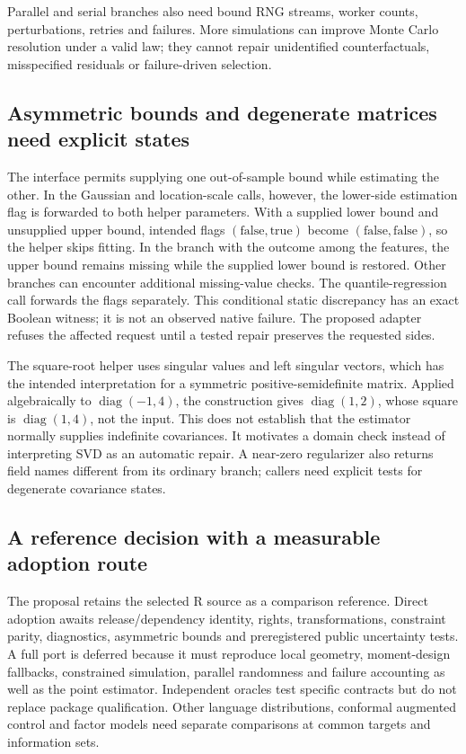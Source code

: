 Parallel and serial branches also need bound RNG streams, worker counts,
perturbations, retries and failures. More simulations can improve Monte
Carlo resolution under a valid law; they cannot repair unidentified
counterfactuals, misspecified residuals or failure-driven selection.
\citep{exec24_scpi_source,exec24_scpi_choice}

\subsection{Asymmetric bounds and degenerate matrices need explicit states}
The interface permits supplying one out-of-sample bound while estimating
the other. In the Gaussian and location-scale calls, however, the
lower-side estimation flag is forwarded to both helper parameters.
With a supplied lower bound and unsupplied upper bound, intended flags
$(\mathrm{false},\mathrm{true})$ become
$(\mathrm{false},\mathrm{false})$, so the helper skips fitting. In the
branch with the outcome among the features, the upper bound remains
missing while the supplied lower bound is restored. Other branches can
encounter additional missing-value checks. The quantile-regression call
forwards the flags separately. This conditional static discrepancy has
an exact Boolean witness; it is not an observed native failure. The
proposed adapter refuses the affected request until a tested repair
preserves the requested sides.~\citep{exec24_scpi_source,exec24_scpi_choice}

The square-root helper uses singular values and left singular vectors,
which has the intended interpretation for a symmetric positive-semidefinite
matrix. Applied algebraically to $\operatorname{diag}(-1,4)$, the
construction gives $\operatorname{diag}(1,2)$, whose square is
$\operatorname{diag}(1,4)$, not the input. This does not establish that the
estimator normally supplies indefinite covariances. It motivates a domain
check instead of interpreting SVD as an automatic repair. A near-zero
regularizer also returns field names different from its ordinary branch;
callers need explicit tests for degenerate covariance states.
\citep{exec24_scpi_source,exec24_scpi_choice}

\subsection{A reference decision with a measurable adoption route}
The proposal retains the selected R source as a comparison reference.
Direct adoption awaits release/dependency identity, rights, transformations,
constraint parity, diagnostics, asymmetric bounds and preregistered public
uncertainty tests. A full port is deferred because it must reproduce local
geometry, moment-design fallbacks, constrained simulation, parallel
randomness and failure accounting as well as the point estimator.
Independent oracles test specific contracts but do not replace package
qualification. Other language distributions, conformal augmented control
and factor models need separate comparisons at common targets and
information sets.~\citep{exec24_scpi_choice}

